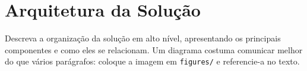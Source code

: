 \section{Arquitetura da Solução}

Descreva a organização da solução em alto nível, apresentando os principais
componentes e como eles se relacionam. Um diagrama costuma comunicar melhor do
que vários parágrafos: coloque a imagem em \texttt{figures/} e referencie-a no
texto.
